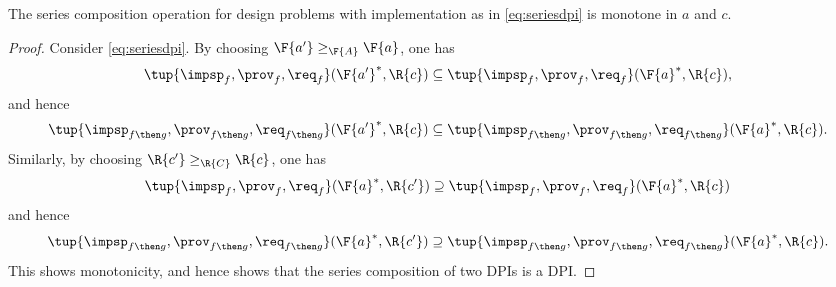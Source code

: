 \begin{lemma}
The series composition operation for design problems with implementation as in \cref{eq:seriesdpi} is monotone in $a$ and $c$.
\end{lemma}
\begin{proof}
Consider \cref{eq:seriesdpi}. By choosing $\F{a'}\geq_\F{A} \F{a}$, one has
\begin{equation}
\tup{\impsp_{f},\prov_{f},\req_{f}}(\F{a'}^*,\R{c})\subseteq \tup{\impsp_{f},\prov_{f},\req_{f}}(\F{a}^*,\R{c}),
\end{equation}
and hence
\begin{equation}
\tup{\impsp_{f\then g},\prov_{f\then g},\req_{f\then g}}(\F{a'}^*,\R{c})\subseteq \tup{\impsp_{f\then g},\prov_{f\then g},\req_{f\then g}}(\F{a}^*,\R{c}).
\end{equation}
Similarly, by choosing $\R{c'}\geq_{\R{C}} \R{c}$, one has
\begin{equation}
\tup{\impsp_{f},\prov_{f},\req_{f}}(\F{a}^*,\R{c'})\supseteq \tup{\impsp_{f},\prov_{f},\req_{f}}(\F{a}^*,\R{c})
\end{equation}
and hence
\begin{equation}
\tup{\impsp_{f\then g},\prov_{f\then g},\req_{f\then g}}(\F{a}^*,\R{c'})\supseteq \tup{\impsp_{f\then g},\prov_{f\then g},\req_{f\then g}}(\F{a}^*,\R{c}).
\end{equation}
This shows monotonicity, and hence shows that the series composition of two DPIs is a DPI.
\end{proof}

